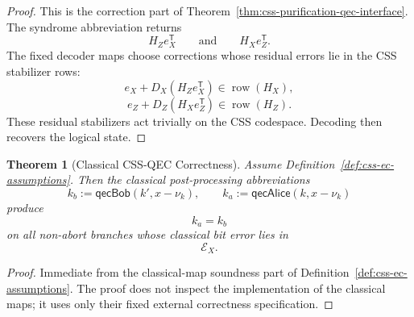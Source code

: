 \documentclass[acmsmall,screen,review,anonymous,nonacm]{acmart}
\theoremstyle{defn_style}
\newtheorem{thm}{Theorem}[section]
\begin{document}
\begin{proof}
This is the correction part of
Theorem~\ref{thm:css-purification-qec-interface}. The syndrome abbreviation
returns
\[
H_Ze_X^{\mathsf T}
\qquad\text{and}\qquad
H_Xe_Z^{\mathsf T}.
\]
The fixed decoder maps choose corrections whose residual errors lie in the CSS
stabilizer rows:
\[
e_X+D_X(H_Ze_X^{\mathsf T})\in \operatorname{row}(H_X),
\]
\[
e_Z+D_Z(H_Xe_Z^{\mathsf T})\in \operatorname{row}(H_Z).
\]
These residual stabilizers act trivially on the CSS codespace. Decoding then
recovers the logical state.
\end{proof}

\begin{thm}[Classical CSS-QEC Correctness]
\label{thm:classical-css-qec-correctness}
Assume Definition~\ref{def:css-ec-assumptions}. Then the classical
post-processing abbreviations
\[
k_b:=\mathsf{qecBob}(k',x-\nu_k),
\qquad
k_a:=\mathsf{qecAlice}(k,x-\nu_k)
\]
produce
\[
k_a=k_b
\]
on all non-abort branches whose classical bit error lies in
\[
\mathcal E_X .
\]
\end{thm}

\begin{proof}
Immediate from the classical-map soundness part of
Definition~\ref{def:css-ec-assumptions}. The proof does not inspect the
implementation of the classical maps; it uses only their fixed external
correctness specification.
\end{proof}
\end{document}
